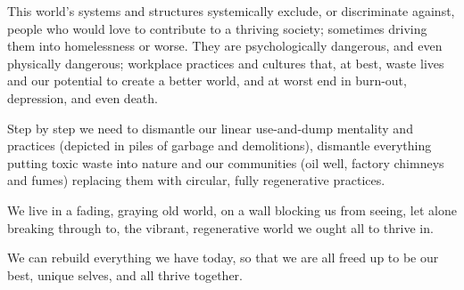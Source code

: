 This world’s systems and structures systemically exclude, or discriminate against, people who would love to contribute to a thriving society; sometimes driving them into homelessness or worse. They are psychologically dangerous, and even physically dangerous; workplace practices and cultures that, at best, waste lives and our potential to create a better world, and at worst end in burn-out, depression, and even death. 


Step by step we need to dismantle our linear use\hyp{}and\hyp{}dump mentality and practices (depicted in piles of garbage and demolitions), dismantle everything putting toxic waste into nature and our communities (oil well, factory chimneys and fumes) replacing them with circular, fully regenerative practices. 


We live in a fading,  graying old world, on a wall blocking us from seeing, let alone breaking through to, the vibrant, regenerative world we ought all to thrive in. 


We can rebuild everything we have today, so that we are all freed up to be our best, unique selves, and all thrive together.